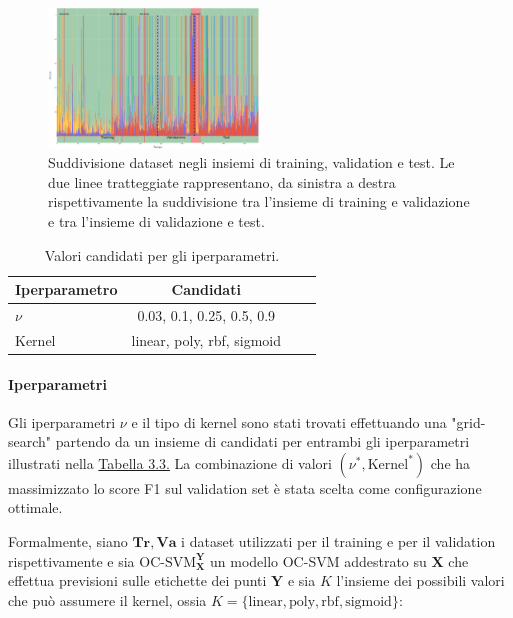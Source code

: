     \begin{figure}[H]
        \centering
        \includegraphics[width=0.5\textwidth]{./input/chapters/models/figs/dataset_div1.png}
        \caption{Suddivisione dataset negli insiemi di training, validation e test. Le due linee 
        tratteggiate rappresentano, da sinistra a destra rispettivamente la suddivisione tra l'insieme di training e 
        validazione e tra l'insieme di validazione e test.}
        \label{fig:dataset-div1}
    \end{figure}


    \begin{table}[H]
        \centering
        \caption{Valori candidati per gli iperparametri.}
        \begin{tabular}{lccc}
            \toprule
            \textbf{Iperparametro} & \textbf{Candidati} \\
            \toprule
            $\nu$ & 0.03, 0.1, 0.25, 0.5, 0.9 \\
            \midrule
            Kernel & linear, poly, rbf, sigmoid \\
            \bottomrule
        \end{tabular}
        \label{tab:iperparametri-candidati}
    \end{table}

        \paragraph{Iperparametri} Gli iperparametri $\nu$ e il tipo di kernel sono stati trovati effettuando una 
        "grid-search" partendo 
        da un insieme di candidati per entrambi gli iperparametri illustrati nella 
        \hyperref[tab:iperparametri-candidati]{Tabella 3.3.} La combinazione di valori $(\nu^*, \text{Kernel}^*)$ che 
        ha massimizzato lo score F1 sul validation set è stata scelta come configurazione ottimale.

        Formalmente, siano $\mathbf{Tr}, \mathbf{Va}$ i dataset utilizzati per il training e
        per il validation rispettivamente e sia $\text{OC-SVM}_\mathbf{X}^\mathbf{Y}$ un modello OC-SVM addestrato
        su $\mathbf{X}$ che effettua previsioni sulle etichette dei punti $\mathbf{Y}$ e sia $K$ l'insieme dei 
        possibili valori che può assumere il kernel, ossia $K=\{\text{linear}, \text{poly}, \text{rbf}, \text{sigmoid}\}$:


